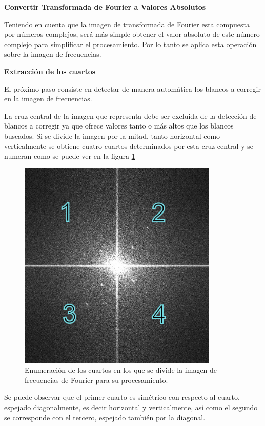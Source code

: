 \documentclass[10pt,a4paper, twoside]{report}
\begin{document}
\textbf{Convertir Transformada de Fourier a Valores Absolutos}

Teniendo en cuenta que la imagen de transformada de Fourier esta compuesta por números complejos, será más simple obtener el valor absoluto de este número complejo para simplificar el procesamiento. Por lo tanto se aplica esta operación sobre la imagen de frecuencias.

\textbf{Extracción de los cuartos}

El próximo paso consiste en detectar de manera automática los blancos a corregir en la imagen de frecuencias.

La cruz central de la imagen que representa debe ser excluida de la detección de blancos a corregir ya que ofrece valores tanto o más altos que los blancos buscados. Si se divide la imagen por la mitad, tanto horizontal como verticalmente se obtiene cuatro cuartos determinados por esta cruz central y se numeran como se puede ver en la figura \ref{CuartosFourier} 

\begin{figure}[!htb]
   \centering      
   \includegraphics[width=0.85\textwidth]{imagenes/CuartosFourier.jpg}
 \caption{Enumeración de los cuartos en los que se divide la imagen de frecuencias de Fourier para su procesamiento.}
 \label{CuartosFourier}
\end{figure}

Se puede observar que el primer cuarto es simétrico con respecto al cuarto, espejado diagonalmente, es decir horizontal y verticalmente, así como el segundo se corresponde con el tercero, espejado también por la diagonal.
\end{document}

